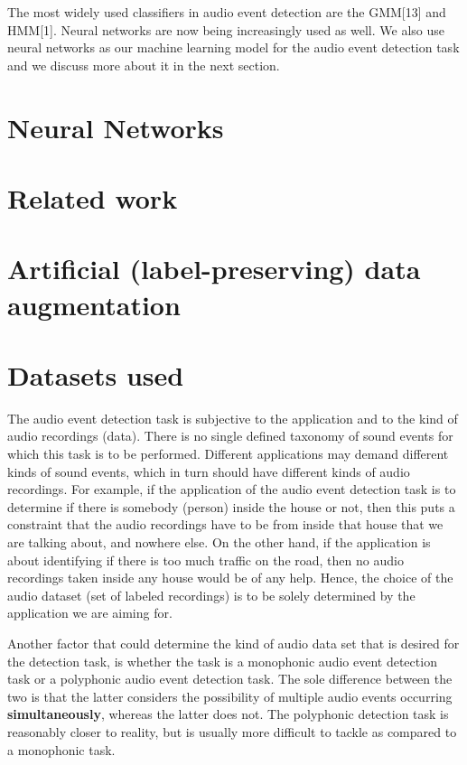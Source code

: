 The most widely used classifiers in audio event detection are the GMM[13] and HMM[1]. Neural networks are now being increasingly used as well. We also use neural networks as our machine learning model for the audio event detection task and we discuss more about it in the next section.

\section{Neural Networks}

\section{Related work}

\section{Artificial (label-preserving) data augmentation}

\section{Datasets used}

The audio event detection task is subjective to the application and to the kind of audio recordings (data). There is no single defined taxonomy of sound events for which this task is to be performed. Different applications may demand different kinds of sound events, which in turn should have different kinds of audio recordings. For example, if the application of the audio event detection task is to determine if there is somebody (person) inside the house or not, then this puts a constraint that the audio recordings have to be from inside that house that we are talking about, and nowhere else. On the other hand, if the application is about identifying if there is too much traffic on the road, then no audio recordings taken inside any house would be of any help. Hence, the choice of the audio dataset (set of labeled recordings) is to be solely determined by the application we are aiming for. 

Another factor that could determine the kind of audio data set that is desired for the detection task, is whether the task is a monophonic audio event detection task or a polyphonic audio event detection task. The sole difference between the two is that the latter considers the possibility of multiple audio events occurring \textbf{simultaneously}, whereas the latter does not. The polyphonic detection task is reasonably closer to reality, but is usually more difficult to tackle as compared to a monophonic task.

